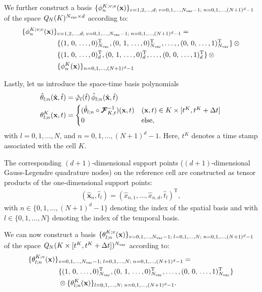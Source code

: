 \documentclass{scrreprt}
\theoremstyle{definition}
\theoremstyle{nonumberplain}
\renewcommand{\vec}[1]{{\textbf{#1}}}
\newcommand{\transp}{^\textrm{T}}
\newcommand{\cell}{K}
\newcommand{\refVec}[1]{\hat{\vec{#1}}}
\newcommand{\imappingst}{\boldsymbol{\mathcal{F}}^{-1}_{\cell,t}}
\newcommand{\polyspace}[3]{\mathit{#1}_{#2}(#3)}
\begin{document}
We further construct a basis $\{{\phi}^{K;v;e}_n
(\vec{x})\}_{e=1,2,\ldots,d;\;v=0,1,\ldots,N_\textup{var}-1;\;n=0,1,\ldots,(N+1)^d-1}$
of the space
$\polyspace{Q}{N}{\cell}^{N_\textup{var}\times d}$ according to:
\begin{align*}
\{{\phi}^{K;v;e}_n
(\vec{x})\}&_{e=1,2,\ldots,d;\;v=0,1,\ldots,N_\textup{var}-1;\;n=0,1,\ldots,(N+1)^d-1}
=
\\
&\lbrace
(
1,\,
0,\,
\ldots,
0
)_{N_\textup{var}}\transp
,
(
0,\,
1,\,
\ldots,
0
)_{N_\textup{var}}\transp
,
\ldots,
,
(
0,\,
0,\,
\ldots,
1
)_{N_\textup{var}}\transp
\rbrace
\,\otimes
\\
&\lbrace
(
1,\,
0,\,
\ldots,
0
)_{d}\transp
,
(
0,\,
1,\,
\ldots,
0
)_{d}\transp
,
\ldots
,
(
0,\,
0,\,
\ldots,
1
)_{d}\transp
\rbrace
\,\otimes
\\
&\{{\phi}^{K}_n(\vec{x})\}_{n=0,1,\ldots,(N+1)^d-1}
\end{align*}

Lastly, let us introduce the space-time basis polynomials
\begin{align*}
\hat{\theta}_{l;n} (\refVec{x},\hat{t}) &=
\hat{\varphi}_{l} (\hat{t})
\,
\hat{\phi}_{l;n} (\refVec{x},\hat{t})
\\
\theta^{K}_{l;n} (\vec{x},t) &=
\begin{cases}
(\hat{\theta}_{l;n} \circ \imappingst) (\vec{x},t) &
(\vec{x},t)\in\cell \times [t^K,t^K+\Delta t]  \\
0 & \textup{else},
\end{cases}
\end{align*}
with $l=0,1,\ldots,N$, and $n=0,1,\ldots,(N+1)^d-1$.
Here, $t^K$ denotes a time stamp associated with
the cell $\cell$.

The corresponding $(d+1)$-dimensional support points ($(d+1)$-dimensional
Gauss-Legendre quadrature nodes) on the reference cell are constructed as tensor
products of the one-dimensional support points:
\begin{align*}
(\refVec{x}_{n},\hat{t}_l) =
(\hat{x}_{n,1},\ldots,\hat{x}_{n,d},\hat{t}_l)\transp,
\end{align*}
with $n\in\{0,1,\ldots,(N+1)^{d}-1\}$ denoting the index of the spatial basis
and with $l\in\{0,1,\ldots,N\}$ denoting the index of the temporal basis.

We can now construct a basis $\{{\theta}^{K;v}_{l;n}
(\vec{x})\}_{v=0,1,\ldots,N_\textup{var}-1;\;l=0,1,\ldots,N;\;n=0,1,\ldots,(N+1)^d-1}$
of the space
$\polyspace{Q}{N}{\cell\times[t^K,t^K+\Delta t]}^{N_\textup{var}}$ according to:
\begin{align*}
\{{\theta}^{K;v}_{l;n}
(\vec{x})\}&_{v=0,1,\ldots,N_\textup{var}-1;\;l=0,1,\ldots,N;\;n=0,1,\ldots,(N+1)^d-1}
= \\
&\lbrace
(
1,\,
0,\,
\ldots,
0
)_{N_\textup{var}}\transp
,
(
0,\,
1,\,
\ldots,
0
)_{N_\textup{var}}\transp
,
\ldots,
,
(
0,\,
0,\,
\ldots,
1
)_{N_\textup{var}}\transp
\rbrace
\\
&\otimes
\{{\theta}^K_{l;n}
(\vec{x})\}_{l=0,1,\ldots,N;\;n=0,1,\ldots,(N+1)^d-1}.
\end{align*}
\end{document}
